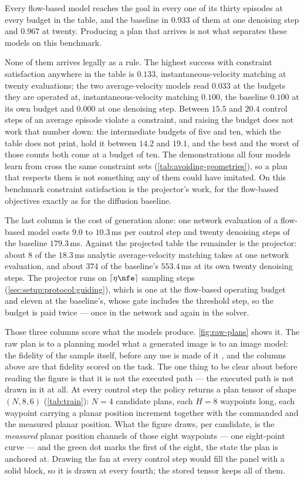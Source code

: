 Every flow-based model reaches the goal in every one of its thirty
episodes at every budget in the table, and the baseline in $0.933$ of them at one denoising step and
$0.967$ at twenty. Producing a plan that arrives is not what separates these models on this benchmark.

None of them arrives legally as a rule. The highest success with constraint satisfaction
anywhere in the table is $0.133$, instantaneous-velocity matching at twenty evaluations; the two
average-velocity models read $0.033$ at the budgets they are operated at, instantaneous-velocity
matching $0.100$, the baseline $0.100$ at its own budget and $0.000$ at one denoising step. Between
$15.5$ and $20.4$ control steps of an average episode violate a constraint, and raising the budget does
not work that number down: the intermediate budgets of five and ten, which the table does not print,
hold it between $14.2$ and $19.1$, and the best and the worst of those counts both come at a budget of ten.
The demonstrations all four models learn from cross the
same constraint sets (\autoref{tab:avoiding-geometries}), so a plan that respects them is not something
any of them could have imitated. On this benchmark constraint satisfaction is the projector's work, for
the flow-based objectives exactly as for the diffusion baseline.

The last column is the cost of generation alone: one network evaluation of a flow-based model costs $9.0$ to
$10.3$\,ms per control step and twenty denoising steps of the baseline $179.3$\,ms. Against the projected
table the remainder is the projector: about $8$ of the $18.3$\,ms analytic average-velocity matching
takes at one network evaluation, and about $374$ of the baseline's $553.4$\,ms at its own twenty
denoising steps. The projector runs on
$\lceil \eta\nfe \rceil$ sampling steps (\autoref{sec:setup:protocol:guiding}), which is one at the
flow-based operating budget and eleven at the baseline's, whose gate includes the threshold step, so the
budget is paid twice --- once in the network and again in the solver.

\FloatBarrier

Those three columns score what the models produce. \autoref{fig:raw-plans} shows it. The raw plan is to a
planning model what a generated image is to an image model: the fidelity of the sample itself, before any
use is made of it \parencite{ho2020denoising,lipman2023flow,geng2025meanflow}, and the columns above are
that fidelity scored on the task. The one thing to be clear about before reading the figure is that it is
not the executed path --- the executed path is not drawn in it
at all. At every control step the policy returns a plan tensor of shape $(N,8,6)$
(\autoref{tab:train}): $N=4$ candidate plans, each $H=8$ waypoints long, each waypoint carrying a planar
position increment together with the commanded and the measured planar position. What the figure draws,
per candidate, is the \emph{measured} planar position channels of those eight waypoints --- one
eight-point curve --- and the green dot marks the first of the eight, the state the plan is anchored at.
Drawing the fan at every control step would fill the panel with a solid block, so it is drawn at every
fourth; the stored tensor keeps all of them.

